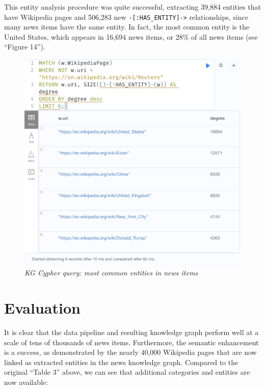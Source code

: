 \documentclass[11pt]{article}
\begin{document}
  This entity analysis procedure was quite successful, extracting 39,884 entities that have Wikipedia pages and 506,283 new \lstinline{-[:HAS_ENTITY]->} relationships, since many news items have the same entity. In fact, the most common entity is the United States, which appears in 16,694 news items, or 28\% of all news items (see ``Figure 14'').  


  \begin{figure}
    \centerline{\includegraphics[scale=0.5]{highest-degree-entities.png}}
    \caption{\textit{KG Cypher query: most common entities in news items}}
  \end{figure}

  \section{Evaluation}

  It is clear that the data pipeline and resulting knowledge graph perform well at a scale of tens of thousands of news items. Furthermore, the semantic enhancement is a success, as demonstrated by the nearly 40,000 Wikipedia pages that are now linked as extracted entities in the news knowledge graph. Compared to the original ``Table 3'' above, we can see that additional categories and entities are now available:
\end{document}
